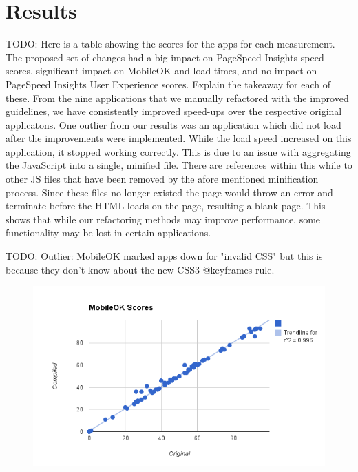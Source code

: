 \documentclass{acm_proc_article-sp}
\begin{document}
\section{Results}
TODO: Here is a table showing the scores for the apps for each measurement. The proposed set of changes had a big impact on PageSpeed Insights speed scores, significant impact on MobileOK and load times, and no impact on PageSpeed Insights User Experience scores. Explain the takeaway for each of these. 
From the nine applications that we manually refactored with the improved guidelines, we have consistently improved speed-ups over the respective original applicatons.
One outlier from our results was an application which did not load after the improvements were implemented.
While the load speed increased on this application, it stopped working correctly.
This is due to an issue with aggregating the JavaScript into a single, minified file.
There are references within this while to other JS files that have been removed by the afore mentioned minification process.
Since these files no longer existed the page would throw an error and terminate before the HTML loads on the page, resulting a blank page.
This shows that while our refactoring methods may improve performance, some functionality may be lost in certain applications.

TODO: Outlier: MobileOK marked apps down for "invalid CSS" but this is because they don't know about the new CSS3 @keyframes rule.

\begin{figure}[h!]
    \includegraphics[scale=0.4]{mobileokrq1}
\end{figure}
\end{document}
